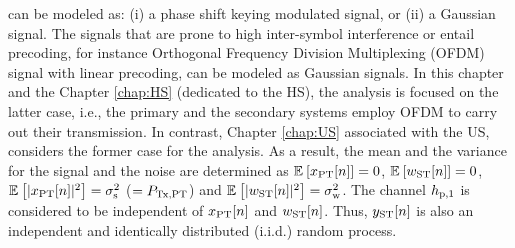  can be modeled as: (i) a phase shift keying modulated signal, or (ii) a Gaussian signal. The signals that are prone to high inter-symbol interference or entail precoding, for instance Orthogonal Frequency Division Multiplexing (OFDM) signal with linear precoding, can be modeled as Gaussian signals. In this chapter and the Chapter \ref{chap:HS} (dedicated to the HS), the analysis is focused on the latter case, i.e., the primary and the secondary systems employ OFDM to carry out their transmission. In contrast, Chapter \ref{chap:US} associated with the US, considers the former case for the analysis. As a result, the mean and the variance for the signal and the noise are determined as ${\mathbb E}_{}\left[ x_{\text{PT}}[n] \right] = 0$, ${\mathbb E}_{}\left[ w_{\text{ST}}[n] \right] = 0$, ${\mathbb E}_{}\left[ |x_{\text{PT}}[n]|^2 \right] = \sigma^2_{\text{s}}$ ($= P_{\text{Tx,PT}}$) and ${\mathbb E}_{}\left[ |w_{\text{ST}}[n]|^2 \right] = \sigma^2_{\text{w}}$. The channel $h_{\text{p,1}}$ is considered to be independent of $x_{\text{PT}}[n]$ and $w_{\text{ST}}[n]$. Thus, $y_{\text{ST}}[n]$ is also an independent and identically distributed (i.i.d.) random process. %

